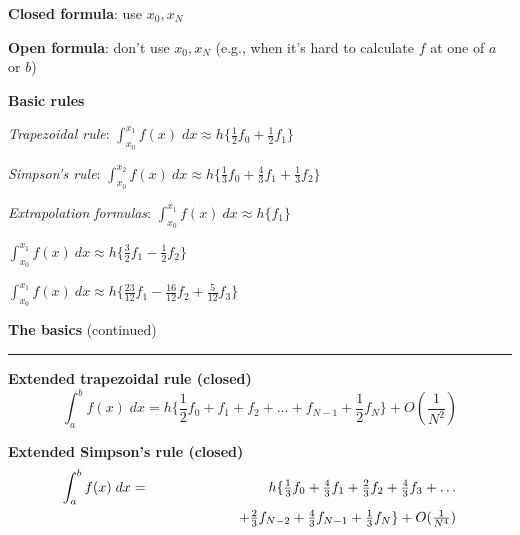 \documentclass[12pt,letterpaper]{article}
\newcommand{\HRule}{\rule{\linewidth}{4pt}}
\newcommand{\hspone}{\hspace*{1cm}}
\newcommand{\hsptwo}{\hspace*{2cm}}
\newcommand{\vsphalf}{\vspace*{0.5cm}}
\begin{document}
\bigskip \bigskip

\textbf{Closed formula}: use $x_0, x_N$

\bigskip

\textbf{Open formula}: don't use $x_0, x_N$ (e.g., when it's hard
to calculate $f$ at one of $a$ or $b$)

\bigskip \bigskip

\textbf{Basic rules}

\bigskip

\hspone \emph{Trapezoidal rule}: \hfill $\int_{x_0}^{x_1} f(x) \; dx
\approx h \{ \frac{1}{2} f_0 + \frac{1}{2} f_1 \}$

\bigskip

\hspone \emph{Simpson's rule}: \hfill $\int_{x_0}^{x_2} f(x) \: dx
\approx h \{ \frac{1}{3} f_0 + \frac{4}{3} f_1 + \frac{1}{3} f_2 \}$

\bigskip \bigskip

\hspone \emph{Extrapolation formulas}:
\hfill $\int_{x_0}^{x_1} f(x) \: dx \approx h \{ f_1 \}$

\bigskip

\hfill $\int_{x_0}^{x_1} f(x) \: dx \approx h \{ \frac{3}{2} f_1 -
\frac{1}{2} f_2 \}$

\bigskip

\hfill $\int_{x_0}^{x_1} f(x) \: dx \approx h \{ \frac{23}{12} f_1 -
\frac{16}{12} f_2 + \frac{5}{12}f_3 \}$

\newpage

\fontsize{30}{30} \selectfont

\centerline{\textbf{The basics} (continued)}

\HRule

\vsphalf

\fontsize{20}{25} \selectfont

\textbf{Extended trapezoidal rule (closed)}
$$ \int_{a}^{b} f(x) \; dx = h \{ {\textstyle \frac{1}{2}} f_0 + f_1 + f_2 + \ldots +
f_{N-1} + {\textstyle \frac{1}{2}} f_N \} + O({\textstyle \frac{1}{N^2}})$$

\bigskip \bigskip

\textbf{Extended Simpson's rule (closed)}
\begin{eqnarray*}
\int_{a}^{b} f(x) \; dx & = & h \{ {\textstyle \frac{1}{3}}f_0 +
{\textstyle \frac{4}{3}}f_1 + {\textstyle \frac{2}{3}}f_2 + {\textstyle \frac{4}{3}}f_3
+ \ldots \\
& & \hsptwo + {\textstyle \frac{2}{3}}f_{N-2} + {\textstyle
  \frac{4}{3}}f_{N-1} + {\textstyle \frac{1}{3}}f_N \} + O({\textstyle
  \frac{1}{N^4}})
\end{eqnarray*}
\end{document}
